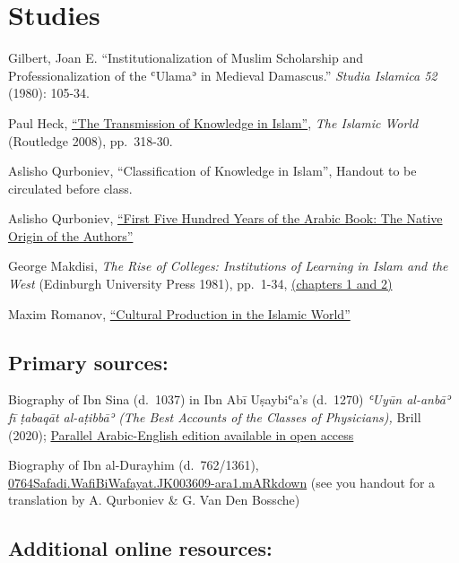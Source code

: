 \documentclass[
]{book}
\begin{document}
\hypertarget{studies}{%
\chapter{Studies}\label{studies}}

Gilbert, Joan E. ``Institutionalization of Muslim Scholarship and Professionalization of the ʿUlamaʾ in Medieval Damascus.'' \emph{Studia Islamica 52} (1980): 105-34.

Paul Heck, \href{https://tinyurl.com/TransmissionKnowledge}{``The Transmission of Knowledge in Islam''}, \emph{The Islamic World} (Routledge 2008), pp.~318-30.

Aslisho Qurboniev, ``Classification of Knowledge in Islam'', Handout to be circulated before class.

Aslisho Qurboniev, \href{https://tinyurl.com/firstfivehundred}{``First Five Hundred Years of the Arabic Book: The Native Origin of the Authors''}

George Makdisi, \emph{The Rise of Colleges: Institutions of Learning in Islam and the West} (Edinburgh University Press 1981), pp.~1-34, \href{https://tinyurl.com/Riseof-Colleges}{(chapters 1 and 2)}

Maxim Romanov, \href{https://alraqmiyyat.github.io/2017/10-14.html}{``Cultural Production in the Islamic World''}

\hypertarget{primary-sources}{%
\section{Primary sources:}\label{primary-sources}}

Biography of Ibn Sina (d.~1037) in Ibn Abī Uṣaybiʿa's (d.~1270) \emph{ʿUyūn al-anbāʾ fī ṭabaqāt al-aṭibbāʾ (The Best Accounts of the Classes of Physicians),} Brill (2020); \href{https://scholarlyeditions.brill.com/reader/urn:cts:arabicLit:0668IbnAbiUsaibia.Tabaqatalatibba.lhom-tr-eng1:11.13/}{Parallel Arabic-English edition available in open access}

Biography of Ibn al-Durayhim (d.~762/1361), \href{https://raw.githubusercontent.com/OpenITI/0775AH/master/data/0764Safadi/0764Safadi.WafiBiWafayat/0764Safadi.WafiBiWafayat.JK003609-ara1.mARkdown}{0764Safadi.WafiBiWafayat.JK003609-ara1.mARkdown} (see you handout for a translation by A. Qurboniev \& G. Van Den Bossche)

\hypertarget{additional-online-resources}{%
\section{Additional online resources:}\label{additional-online-resources}}
\end{document}
